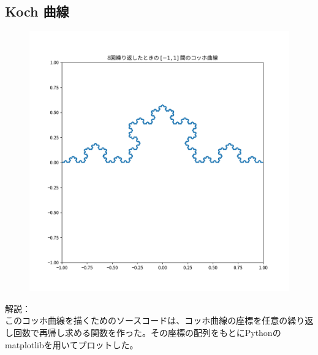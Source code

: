 \subsection{Koch 曲線}
\begin{figure}[htbp]
  \centering
  \includegraphics[keepaspectratio, scale=0.8]{images/OtherProblem/ctest5_3.png}
\end{figure}
解説：\\
このコッホ曲線を描くためのソースコードは、コッホ曲線の座標を任意の繰り返し回数で再帰し求める関数を作った。その座標の配列をもとにPythonのmatplotlibを用いてプロットした。\\
